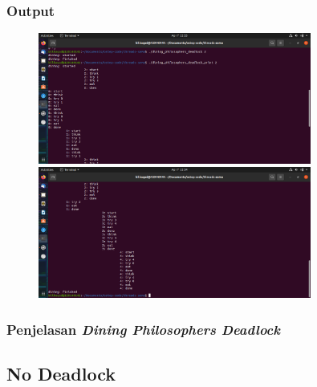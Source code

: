 \documentclass[11pt,a4paper]{article}
\begin{document}
\newpage
\subsubsection{Output}
\begin{figure}[h]
	\centering
	\includegraphics[width=0.8\textwidth]{Figure1/dining_deadlock1.png}
	\includegraphics[width=0.8\textwidth]{Figure1/dining_deadlock2.png}
\end{figure}

\subsubsection{Penjelasan \textit{Dining Philosophers Deadlock}}

\newpage
\subsection{No Deadlock}
\end{document}
